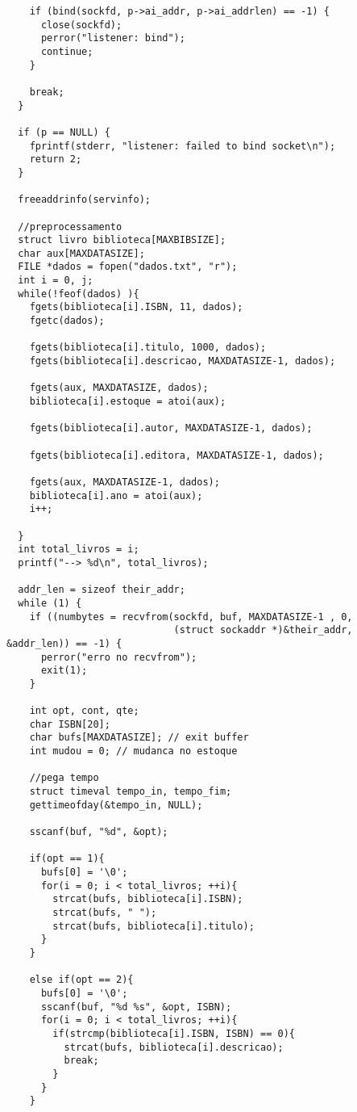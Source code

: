 \documentclass[11pt, brazil]{article} %
\begin{document}
\begin{verbatim}
    if (bind(sockfd, p->ai_addr, p->ai_addrlen) == -1) {
      close(sockfd);
      perror("listener: bind");
      continue;
    }

    break;
  }

  if (p == NULL) {
    fprintf(stderr, "listener: failed to bind socket\n");
    return 2;
  }

  freeaddrinfo(servinfo);
    
  //preprocessamento
  struct livro biblioteca[MAXBIBSIZE];
  char aux[MAXDATASIZE];
  FILE *dados = fopen("dados.txt", "r");
  int i = 0, j;
  while(!feof(dados) ){
    fgets(biblioteca[i].ISBN, 11, dados);
    fgetc(dados);
		
    fgets(biblioteca[i].titulo, 1000, dados);
    fgets(biblioteca[i].descricao, MAXDATASIZE-1, dados);
		
    fgets(aux, MAXDATASIZE, dados);
    biblioteca[i].estoque = atoi(aux);
		
    fgets(biblioteca[i].autor, MAXDATASIZE-1, dados);
		
    fgets(biblioteca[i].editora, MAXDATASIZE-1, dados);
		
    fgets(aux, MAXDATASIZE-1, dados);
    biblioteca[i].ano = atoi(aux);
    i++;
		
  }
  int total_livros = i;
  printf("--> %d\n", total_livros);

  addr_len = sizeof their_addr;
  while (1) {
    if ((numbytes = recvfrom(sockfd, buf, MAXDATASIZE-1 , 0,
                             (struct sockaddr *)&their_addr, &addr_len)) == -1) {
      perror("erro no recvfrom");
      exit(1);
    }

    int opt, cont, qte;
    char ISBN[20];
    char bufs[MAXDATASIZE]; // exit buffer		    	
    int mudou = 0; // mudanca no estoque
		    	
    //pega tempo
    struct timeval tempo_in, tempo_fim;
    gettimeofday(&tempo_in, NULL);
		    	
    sscanf(buf, "%d", &opt);
		    	
    if(opt == 1){
      bufs[0] = '\0';
      for(i = 0; i < total_livros; ++i){
        strcat(bufs, biblioteca[i].ISBN);
        strcat(bufs, " ");
        strcat(bufs, biblioteca[i].titulo);
      }
    }
		    	
    else if(opt == 2){
      bufs[0] = '\0';
      sscanf(buf, "%d %s", &opt, ISBN);
      for(i = 0; i < total_livros; ++i){
        if(strcmp(biblioteca[i].ISBN, ISBN) == 0){
          strcat(bufs, biblioteca[i].descricao);
          break;
        }		    				
      }
    }
		    	

\end{verbatim}
\end{document}
